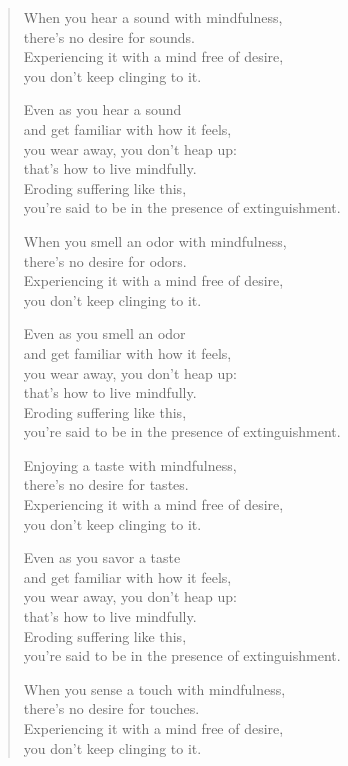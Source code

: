 \documentclass[12pt,openany]{book}%
\begin{document}
\begin{verse}
When you hear a sound with mindfulness, \\
there’s no desire for sounds. \\
Experiencing it with a mind free of desire, \\
you don’t keep clinging to it. 

Even as you hear a sound \\
and get familiar with how it feels, \\
you wear away, you don’t heap up: \\
that’s how to live mindfully. \\
Eroding suffering like this, \\
you’re said to be in the presence of extinguishment. 

When you smell an odor with mindfulness, \\
there’s no desire for odors. \\
Experiencing it with a mind free of desire, \\
you don’t keep clinging to it. 

Even as you smell an odor \\
and get familiar with how it feels, \\
you wear away, you don’t heap up: \\
that’s how to live mindfully. \\
Eroding suffering like this, \\
you’re said to be in the presence of extinguishment. 

Enjoying a taste with mindfulness, \\
there’s no desire for tastes. \\
Experiencing it with a mind free of desire, \\
you don’t keep clinging to it. 

Even as you savor a taste \\
and get familiar with how it feels, \\
you wear away, you don’t heap up: \\
that’s how to live mindfully. \\
Eroding suffering like this, \\
you’re said to be in the presence of extinguishment. 

When you sense a touch with mindfulness, \\
there’s no desire for touches. \\
Experiencing it with a mind free of desire, \\
you don’t keep clinging to it. 


\end{verse}
\end{document}
